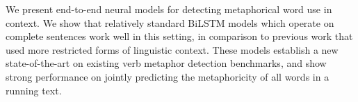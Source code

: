 We present end-to-end neural models for detecting metaphorical word use in context. We show that relatively standard BiLSTM models which operate on complete sentences work well in this setting, in comparison to previous work that used more restricted forms of linguistic context. These models establish a new state-of-the-art on existing verb metaphor detection benchmarks, and show strong performance on jointly predicting the metaphoricity of all words in a running text.
